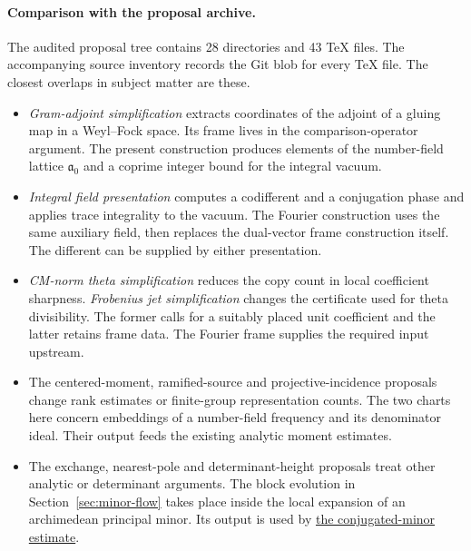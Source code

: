 \documentclass[11pt,letterpaper]{article}
\newcommand{\baseurl}{https://github.com/VladimirReshetnikov/ProveIt/blob/f2d6ab6c4b70ea73b2deac9e33ad966bc92ea36f/Analysis/GeneralizedRiemannHypothesis/}
\newcommand{\source}[3]{\href{\baseurl Lean/grh/src/#1.lean\#L#2}{#3}}
\begin{document}
\paragraph{Comparison with the proposal archive.}
The audited proposal tree contains 28 directories and 43 TeX files. The accompanying source inventory records the Git blob for every TeX file. The closest overlaps in subject matter are these.
\begin{itemize}
\item \emph{Gram-adjoint simplification} extracts coordinates of the adjoint of a gluing map in a Weyl--Fock space. Its frame lives in the comparison-operator argument. The present construction produces elements of the number-field lattice $\mathfrak a_0$ and a coprime integer bound for the integral vacuum.
\item \emph{Integral field presentation} computes a codifferent and a conjugation phase and applies trace integrality to the vacuum. The Fourier construction uses the same auxiliary field, then replaces the dual-vector frame construction itself. The different can be supplied by either presentation.
\item \emph{CM-norm theta simplification} reduces the copy count in local coefficient sharpness. \emph{Frobenius jet simplification} changes the certificate used for theta divisibility. The former calls for a suitably placed unit coefficient and the latter retains frame data. The Fourier frame supplies the required input upstream.
\item The centered-moment, ramified-source and projective-incidence proposals change rank estimates or finite-group representation counts. The two charts here concern embeddings of a number-field frequency and its denominator ideal. Their output feeds the existing analytic moment estimates.
\item The exchange, nearest-pole and determinant-height proposals treat other analytic or determinant arguments. The block evolution in Section~\ref{sec:minor-flow} takes place inside the local expansion of an archimedean principal minor. Its output is used by \source{New/Appendix/DiscreteSeries/OneMinor}{609}{the conjugated-minor estimate}.
\end{itemize}
\end{document}
